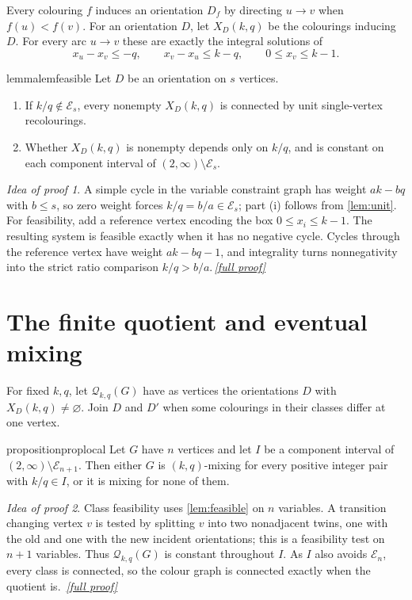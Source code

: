 \documentclass[11pt,a4paper]{article}
\theoremstyle{plain}
\theoremstyle{definition}
\theoremstyle{remark}
\newtheorem*{proofidea}{Idea of proof}
\newcommand{\fullproofref}[1]{\,\hyperref[#1]{\textit{[full proof]}}}
\newcommand{\cE}{\mathcal E}
\newcommand{\cQ}{\mathcal Q}
\begin{document}
Every colouring $f$ induces an orientation $D_f$ by directing $u\to v$ when
$f(u)<f(v)$.  For an orientation $D$, let $X_D(k,q)$ be the colourings inducing $D$.
For every arc $u\to v$ these are exactly the integral solutions of
\[
 x_u-x_v\le-q,\qquad x_v-x_u\le k-q,
 \qquad0\le x_v\le k-1.
\]

\begin{restatable}{lemma}{lemfeasible}\label{lem:feasible}
Let $D$ be an orientation on $s$ vertices.
\begin{enumerate}[label=\textup{(\roman*)}]
\item If $k/q\notin\cE_s$, every nonempty $X_D(k,q)$ is connected by unit
single-vertex recolourings.
\item Whether $X_D(k,q)$ is nonempty depends only on $k/q$, and is constant on each
component interval of $(2,\infty)\setminus\cE_s$.
\end{enumerate}
\end{restatable}
\begin{proofidea}
A simple cycle in the variable constraint graph has weight $ak-bq$ with $b\le s$, so
zero weight forces $k/q=b/a\in\cE_s$; part (i) follows from \cref{lem:unit}.  For
feasibility, add a reference vertex encoding the box $0\le x_i\le k-1$.  The resulting
system is feasible exactly when it has no negative cycle.  Cycles through the reference
vertex have weight $ak-bq-1$, and integrality turns nonnegativity into the strict ratio
comparison $k/q>b/a$.\fullproofref{pf:feasible}
\end{proofidea}

\section{The finite quotient and eventual mixing}

For fixed $k,q$, let $\cQ_{k,q}(G)$ have as vertices the orientations $D$ with
$X_D(k,q)\ne\varnothing$.  Join $D$ and $D'$ when some colourings in their classes
differ at one vertex.

\begin{restatable}{proposition}{proplocal}\label{prop:local}
Let $G$ have $n$ vertices and let $I$ be a component interval of
$(2,\infty)\setminus\cE_{n+1}$.  Then either $G$ is $(k,q)$-mixing for every positive
integer pair with $k/q\in I$, or it is mixing for none of them.
\end{restatable}
\begin{proofidea}
Class feasibility uses \cref{lem:feasible} on $n$ variables.  A transition changing
vertex $v$ is tested by splitting $v$ into two nonadjacent twins, one with the old and
one with the new incident orientations; this is a feasibility test on $n+1$ variables.
Thus $\cQ_{k,q}(G)$ is constant throughout $I$.  As $I$ also avoids $\cE_n$, every
class is connected, so the colour graph is connected exactly when the quotient is.
\fullproofref{pf:local}
\end{proofidea}
\end{document}
